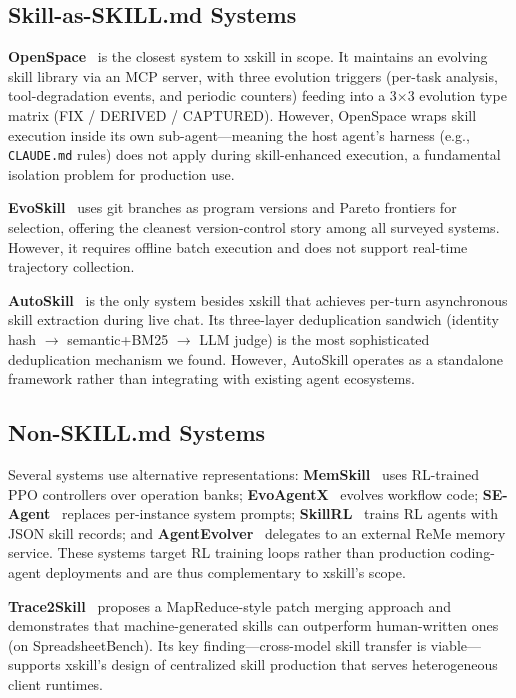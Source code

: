 \documentclass[11pt]{article}
\begin{document}
\subsection{Skill-as-SKILL.md Systems}

\textbf{OpenSpace}~\citep{hku2025openspace} is the closest system to xskill in scope. It maintains an evolving skill library via an MCP server, with three evolution triggers (per-task analysis, tool-degradation events, and periodic counters) feeding into a 3$\times$3 evolution type matrix (FIX / DERIVED / CAPTURED). However, OpenSpace wraps skill execution inside its own sub-agent---meaning the host agent's harness (e.g., \texttt{CLAUDE.md} rules) does not apply during skill-enhanced execution, a fundamental isolation problem for production use.

\textbf{EvoSkill}~\citep{sentient2025evoskill} uses git branches as program versions and Pareto frontiers for selection, offering the cleanest version-control story among all surveyed systems. However, it requires offline batch execution and does not support real-time trajectory collection.

\textbf{AutoSkill}~\citep{ecnu2025autoskill} is the only system besides xskill that achieves per-turn asynchronous skill extraction during live chat. Its three-layer deduplication sandwich (identity hash $\to$ semantic+BM25 $\to$ LLM judge) is the most sophisticated deduplication mechanism we found. However, AutoSkill operates as a standalone framework rather than integrating with existing agent ecosystems.

\subsection{Non-SKILL.md Systems}

Several systems use alternative representations: \textbf{MemSkill}~\citep{memskill2025} uses RL-trained PPO controllers over operation banks; \textbf{EvoAgentX}~\citep{evoagentx2025} evolves workflow code; \textbf{SE-Agent}~\citep{seagent2025} replaces per-instance system prompts; \textbf{SkillRL}~\citep{skillrl2025} trains RL agents with JSON skill records; and \textbf{AgentEvolver}~\citep{agentevolver2025} delegates to an external ReMe memory service. These systems target RL training loops rather than production coding-agent deployments and are thus complementary to xskill's scope.

\textbf{Trace2Skill}~\citep{alibaba2025trace2skill} proposes a MapReduce-style patch merging approach and demonstrates that machine-generated skills can outperform human-written ones (on SpreadsheetBench). Its key finding---cross-model skill transfer is viable---supports xskill's design of centralized skill production that serves heterogeneous client runtimes.
\end{document}
